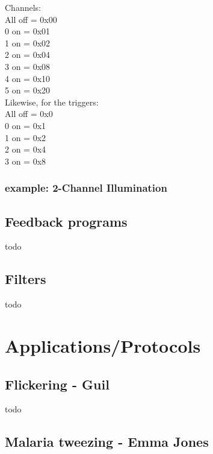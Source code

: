 \documentclass{report}
\begin{document}
Channels:\\
All off = 0x00\\
0 on = 0x01\\
1 on = 0x02\\
2 on = 0x04\\
3 on = 0x08\\
4 on = 0x10\\
5 on = 0x20\\

Likewise, for the triggers:\\
All off = 0x0\\
0 on = 0x1\\
1 on = 0x2\\
2 on = 0x4\\
3 on = 0x8\\

\newpage

\subsection{example:  2-Channel Illumination}



\section{Feedback programs}

todo



\section{Filters}

todo





\newpage


\chapter{Applications/Protocols}

\section{Flickering - Guil}
 todo

\section{Malaria tweezing - Emma Jones}
\end{document}
